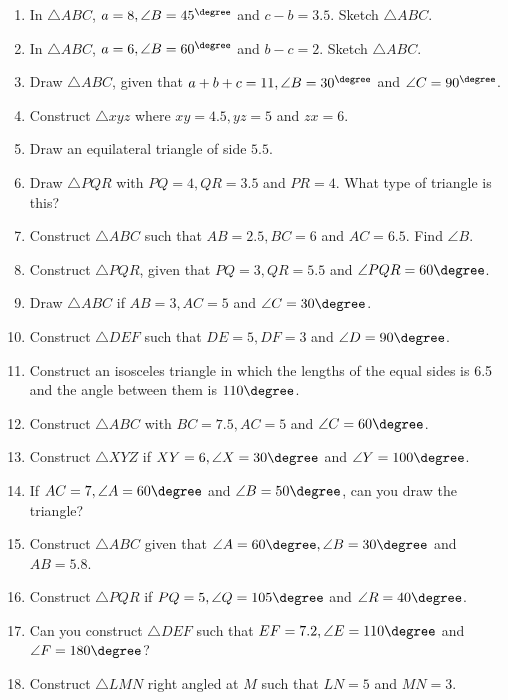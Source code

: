 \renewcommand{\theequation}{\theenumi}
\begin{enumerate}[label=\arabic*.,ref=\thesubsection.\theenumi]

\item In $\triangle ABC$,  $a = 8, \angle B = 45^{\degree}$ and $c-b = 3.5$.
Sketch $\triangle ABC$.

\item In $\triangle ABC$,  $a = 6, \angle B = 60^{\degree}$ and $b-c = 2$. 
Sketch $\triangle ABC$.
\item Draw $\triangle ABC$,  given that $a+b+c = 11, \angle B = 30^{\degree}$ and $\angle C = 90^{\degree}$.
\item Construct $\triangle xyz$ where $xy = 4.5, yz = 5$ and $zx = 6$.
\item Draw an equilateral triangle of side $5.5$.
\item Draw $\triangle PQR$ with $PQ = 4, QR = 3.5$ and $PR = 4$.  What type of triangle is this?
\item Construct $\triangle ABC$ such that $AB = 2.5, BC = 6$ and $AC = 6.5$.  Find $\angle B$.
\item Construct $\triangle PQR$, given that $PQ = 3, QR = 5.5$ and $\angle PQR = 60 \degree$.
\item Draw $\triangle ABC$ if $AB = 3, AC = 5$ and $\angle C = 30 \degree$.
\item Construct $\triangle DEF$ such that $DE = 5, DF = 3$ and $\angle D = 90\degree$.
\item Construct an isosceles triangle in which the lengths of the equal sides is 6.5 and the angle between them is $110\degree$.
\item Construct $\triangle ABC$  with $BC = 7.5, AC = 5$ and $\angle C = 60\degree$.
\item Construct $\triangle XYZ$ if $XY = 6, \angle X = 30\degree$ and $\angle Y = 100 \degree$.
\item If $AC = 7, \angle A = 60\degree$ and $\angle B = 50 \degree$, can you draw the triangle?
\item Construct $\triangle ABC$ given that $\angle A = 60\degree, \angle B = 30\degree$ and $AB = 5.8$.
\item Construct $\triangle PQR$ if $PQ = 5, \angle Q = 105 \degree$ and $\angle R = 40 \degree$.
\item Can you construct $\triangle DEF$ such that $EF = 7.2, \angle E = 110\degree$ and $\angle F = 180\degree$?
\item Construct  $\triangle LMN$ right angled at $M$ such that $LN = 5$ and $MN = 3$.

\end{enumerate}
